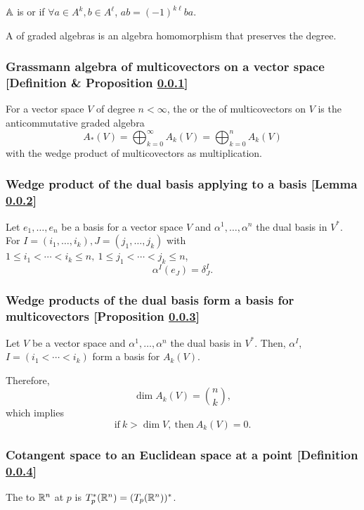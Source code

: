 $\mathbb{A}$ is  or  if $\forall a \in A^k, b \in A^\ell$, $ab = (-1)^{k\ell} ba$.

A  of graded algebras is an algebra homomorphism that preserves the degree.

\subsubsection{Grassmann algebra of multicovectors on a vector space [Definition \& Proposition \ref{grassmann-algebra-of-multicovectors-on-a-vector-space}]}\label{grassmann-algebra-of-multicovectors-on-a-vector-space}
For a vector space $V$ of degree $n < \infty$, the  or the  of multicovectors on $V$ is the anticommutative graded algebra
\[
A_* (V) = \bigoplus_{k = 0}^\infty A_k(V) = \bigoplus_{k = 0}^n A_k(V)
\]
with the wedge product of multicovectors as multiplication.

\subsubsection{Wedge product of the dual basis applying to a basis [Lemma \ref{wedge-product-of-the-dual-basis-applying-to-a-basis}]}\label{wedge-product-of-the-dual-basis-applying-to-a-basis}
Let $e_1, \dotsc, e_n$ be a basis for a vector space $V$ and $\alpha^1, \dotsc, \alpha^n$ the dual basis in $V^*$. For $I = (i_1, \dotsc, i_k), J = (j_1, \dotsc, j_k)$ with $1 \le i_1 < \dotsb < i_k \le n,\ 1 \le j_1 < \dotsb < j_k \le n$,
\[
\alpha^I (e_J) = \delta^I_J.
\]

\subsubsection{Wedge products of the dual basis form a basis for multicovectors [Proposition \ref{wedge-products-of-the-dual-basis-form-a-basis-for-multicovectors}]}\label{wedge-products-of-the-dual-basis-form-a-basis-for-multicovectors}
Let $V$ be a vector space and $\alpha^1,\dotsc,\alpha^n$ the dual basis in $V^*$. Then, $\alpha^I$, $I = (i_1 < \dotsb < i_k)$ form a basis for $A_k(V)$.

Therefore,
\[
\dim A_k(V) = \binom{n}{k},
\]
which implies
\[
\text{if}\ k > \dim V,\ \text{then}\ A_k(V) = 0.
\]

\subsubsection{Cotangent space to an Euclidean space at a point [Definition \ref{cotangent-space-to-an-euclidean-space-at-a-point}]}\label{cotangent-space-to-an-euclidean-space-at-a-point}
The  to $\mathbb{R}^n$ at $p$ is $T^*_p (\mathbb{R}^n) = (T_p(\mathbb{R}^n))^*$.

